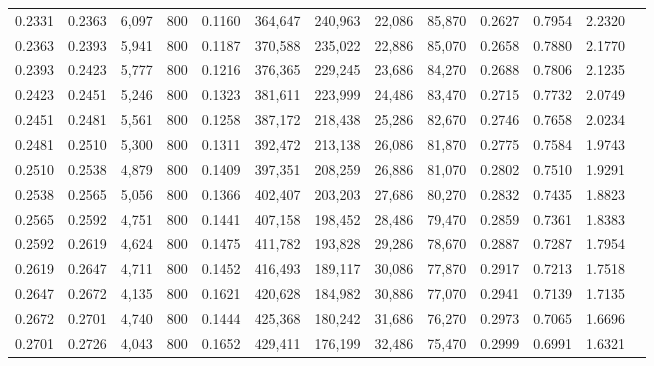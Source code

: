 \begin{tabular}{rrrrrrrrrrrrr}
0.2331 & 0.2363 &  6,097 &   800 &                                     0.1160 & 364,647 & 240,963 &  22,086 &  85,870 & 0.2627 & 0.7954 & 2.2320 \\
0.2363 & 0.2393 &  5,941 &   800 &                                     0.1187 & 370,588 & 235,022 &  22,886 &  85,070 & 0.2658 & 0.7880 & 2.1770 \\
0.2393 & 0.2423 &  5,777 &   800 &                                     0.1216 & 376,365 & 229,245 &  23,686 &  84,270 & 0.2688 & 0.7806 & 2.1235 \\
0.2423 & 0.2451 &  5,246 &   800 &                                     0.1323 & 381,611 & 223,999 &  24,486 &  83,470 & 0.2715 & 0.7732 & 2.0749 \\
0.2451 & 0.2481 &  5,561 &   800 &                                     0.1258 & 387,172 & 218,438 &  25,286 &  82,670 & 0.2746 & 0.7658 & 2.0234 \\
0.2481 & 0.2510 &  5,300 &   800 &                                     0.1311 & 392,472 & 213,138 &  26,086 &  81,870 & 0.2775 & 0.7584 & 1.9743 \\
0.2510 & 0.2538 &  4,879 &   800 &                                     0.1409 & 397,351 & 208,259 &  26,886 &  81,070 & 0.2802 & 0.7510 & 1.9291 \\
0.2538 & 0.2565 &  5,056 &   800 &                                     0.1366 & 402,407 & 203,203 &  27,686 &  80,270 & 0.2832 & 0.7435 & 1.8823 \\
0.2565 & 0.2592 &  4,751 &   800 &                                     0.1441 & 407,158 & 198,452 &  28,486 &  79,470 & 0.2859 & 0.7361 & 1.8383 \\
0.2592 & 0.2619 &  4,624 &   800 &                                     0.1475 & 411,782 & 193,828 &  29,286 &  78,670 & 0.2887 & 0.7287 & 1.7954 \\
0.2619 & 0.2647 &  4,711 &   800 &                                     0.1452 & 416,493 & 189,117 &  30,086 &  77,870 & 0.2917 & 0.7213 & 1.7518 \\
0.2647 & 0.2672 &  4,135 &   800 &                                     0.1621 & 420,628 & 184,982 &  30,886 &  77,070 & 0.2941 & 0.7139 & 1.7135 \\
0.2672 & 0.2701 &  4,740 &   800 &                                     0.1444 & 425,368 & 180,242 &  31,686 &  76,270 & 0.2973 & 0.7065 & 1.6696 \\
0.2701 & 0.2726 &  4,043 &   800 &                                     0.1652 & 429,411 & 176,199 &  32,486 &  75,470 & 0.2999 & 0.6991 & 1.6321 \\

\end{tabular}
